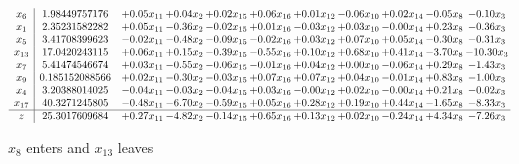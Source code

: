 \documentclass[9pt]{article}
\begin{document}
 \[\begin{array}{c| c c@{\hskip 2pt} c@{\hskip 2pt} c@{\hskip 2pt} c@{\hskip 2pt} c@{\hskip 2pt} c@{\hskip 2pt} c@{\hskip 2pt} c@{\hskip 2pt} c@{\hskip 2pt} }
 x_{6}   &  1.98449757176 & +  0.05 x_{11} & +  0.04 x_{2} & +  0.02 x_{15} & +  0.06 x_{16} & +  0.01 x_{12} & -0.06 x_{10} & +  0.02 x_{14} & -0.05 x_{8} & -0.10 x_{3}\\
 x_{1}   &  2.35231582282 & +  0.05 x_{11} & -0.36 x_{2} & -0.02 x_{15} & +  0.01 x_{16} & -0.03 x_{12} & +  0.03 x_{10} & -0.00 x_{14} & +  0.23 x_{8} & -0.36 x_{3}\\
 x_{5}   &  3.41708399623 & -0.02 x_{11} & -0.48 x_{2} & -0.09 x_{15} & -0.02 x_{16} & +  0.03 x_{12} & +  0.07 x_{10} & +  0.05 x_{14} & -0.30 x_{8} & -0.31 x_{3}\\
 x_{13}   &  17.0420243115 & +  0.06 x_{11} & +  0.15 x_{2} & -0.39 x_{15} & -0.55 x_{16} & +  0.10 x_{12} & +  0.68 x_{10} & +  0.41 x_{14} & -3.70 x_{8} & -10.30 x_{3}\\
 x_{7}   &  5.41474546674 & +  0.03 x_{11} & -0.55 x_{2} & -0.06 x_{15} & -0.01 x_{16} & +  0.04 x_{12} & +  0.00 x_{10} & -0.06 x_{14} & +  0.29 x_{8} & -1.43 x_{3}\\
 x_{9}   &  0.185152088566 & +  0.02 x_{11} & -0.30 x_{2} & -0.03 x_{15} & +  0.07 x_{16} & +  0.07 x_{12} & +  0.04 x_{10} & -0.01 x_{14} & +  0.83 x_{8} & -1.00 x_{3}\\
 x_{4}   &  3.20388014025 & -0.04 x_{11} & -0.03 x_{2} & -0.04 x_{15} & +  0.03 x_{16} & -0.00 x_{12} & +  0.02 x_{10} & -0.00 x_{14} & +  0.21 x_{8} & -0.02 x_{3}\\
 x_{17}   &  40.3271245805 & -0.48 x_{11} & -6.70 x_{2} & -0.59 x_{15} & +  0.05 x_{16} & +  0.28 x_{12} & +  0.19 x_{10} & +  0.44 x_{14} & -1.65 x_{8} & -8.33 x_{3}\\
\hline
z    &  25.3017609684 & +  0.27 x_{11} & -4.82 x_{2} & -0.14 x_{15} & +  0.65 x_{16} & +  0.13 x_{12} & +  0.02 x_{10} & -0.24 x_{14} & +  4.34 x_{8} & -7.26 x_{3}\\
\end{array}\]


 $ x_{8} $ enters and $ x_{13} $ leaves 
\end{document}
